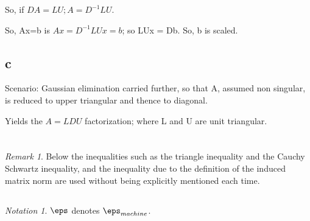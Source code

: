 \documentclass[10pt]{amsart}
\theoremstyle{remark}
\newtheorem*{notation}{Notation}
\newtheorem{rem}[thm]{Remark}
\begin{document}
So, if $DA = LU; A = D^{-1}LU$.

So, Ax=b is $Ax = D^{-1}LUx = b$; so LUx = Db. So, b is scaled.

\subsection{c}
Scenario: Gaussian elimination carried further, so that A, assumed non singular, is reduced to upper triangular and thence to diagonal.

Yields the $A = LDU$ factorization; where L and U are unit triangular.

\section{}
\begin{rem}
Below the inequalities such as the triangle inequality and the Cauchy Schwartz inequality, and the inequality due to the definition of the induced matrix norm are used without being explicitly mentioned each time.
\end{rem}

\subsection{}
\begin{notation}
$\eps$ denotes $\eps_{machine}$.
\end{notation}
\end{document}
